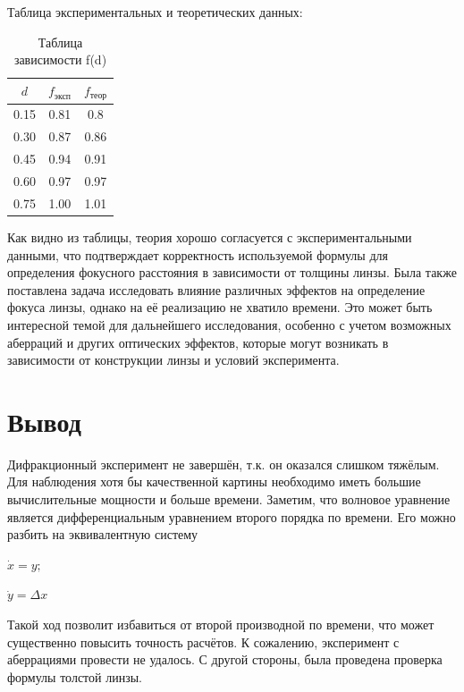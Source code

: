 \documentclass[
11pt,%
tightenlines,%
twoside,%
onecolumn,%
nofloats,%
nobibnotes,%
nofootinbib,%
superscriptaddress,%
noshowpacs,%
centertags]%
{revtex4}
\begin{document}
Таблица экспериментальных и теоретических данных:
\begin{table}[!htb]
    \setcaptionmargin{0mm}
    \onelinecaptionstrue
    \caption{Таблица зависимости f(d)}
    \bigskip
    \begin{tabular}{|c|c|c|}
      \hline
      $d$  & $f_{\text{эксп}}$ & $f_{\text{теор}}$ \\
      \hline
      0.15 & 0.81 & 0.8\\
      \hline
      0.30 & 0.87 & 0.86\\
      \hline
      0.45 & 0.94 & 0.91\\
      \hline
      0.60 & 0.97 & 0.97\\
      \hline
      0.75 & 1.00 & 1.01\\[1mm]
      \hline
    \end{tabular}
\end{table}
Как видно из таблицы, теория хорошо согласуется с экспериментальными данными, что подтверждает 
корректность используемой формулы для определения фокусного расстояния в зависимости от толщины линзы. \newline
Была также поставлена задача исследовать влияние различных эффектов на определение фокуса линзы,
однако на её реализацию не хватило времени. Это может быть интересной темой для дальнейшего
исследования, особенно с учетом возможных аберраций и других оптических эффектов, которые могут 
возникать в зависимости от конструкции линзы и условий эксперимента.



\section{Вывод}
Дифракционный эксперимент не завершён, т.к. он оказался слишком тяжёлым. Для наблюдения хотя бы 
качественной картины необходимо иметь большие вычислительные мощности и больше времени. 
Заметим, что волновое уравнение является дифференциальным уравнением второго порядка по времени.
Его можно разбить на эквивалентную систему
\begin{center}
    $\dot{x} = y;$
\end{center}
\begin{center}
    $\dot{y} = \Delta x$
\end{center}
Такой ход позволит избавиться от второй производной по времени, что может существенно повысить точность
расчётов.
К сожалению, эксперимент с аберрациями провести не удалось. С другой стороны, была проведена проверка
формулы толстой линзы.
\end{document}
